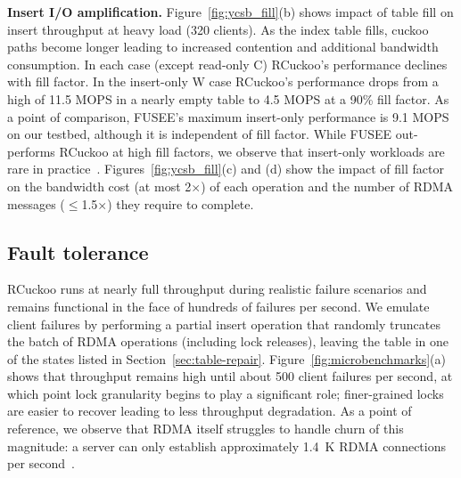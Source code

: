 \textbf{Insert I/O amplification.}
Figure~\ref{fig:ycsb_fill}(b) shows impact of table fill on insert throughput at heavy load (320 clients). As the
index table fills, cuckoo paths become longer leading to increased contention and additional
bandwidth consumption. In each case (except read-only C) RCuckoo's
performance declines with fill factor. In the insert-only W case RCuckoo's performance drops from a
high of 11.5 MOPS in a nearly empty table to 4.5 MOPS at a 90\% fill factor.  As a point of
comparison, FUSEE's maximum insert-only performance is 9.1 MOPS on our testbed, although it is
independent of fill factor.  While FUSEE out-performs RCuckoo at high fill factors, we observe that
insert-only workloads are rare in practice~\cite{facebook-memcached}.
Figures~\ref{fig:ycsb_fill}(c) and (d) show the impact of fill factor on the bandwidth cost (at most 2$\times$) of each
operation and the number of RDMA messages ($\leq$1.5$\times$) they require to complete.


\subsection{Fault tolerance}


RCuckoo runs at nearly full throughput during realistic
failure scenarios and remains functional in the face of
hundreds of failures per second.
We emulate client failures by
performing a partial insert operation that randomly truncates the
batch of RDMA operations (including lock releases), leaving the table
in one of the  states listed in
Section~\ref{sec:table-repair}.
Figure~\ref{fig:microbenchmarks}(a) shows that
throughput remains high until about 500 client failures per second, at
which point lock granularity begins to play a significant role;
finer-grained locks are easier to recover leading to less throughput
degradation.
As a point of reference, we observe that RDMA itself struggles to handle churn of this magnitude:
a server can only
establish approximately 1.4~K RDMA connections per second~\cite{xrdma}.

